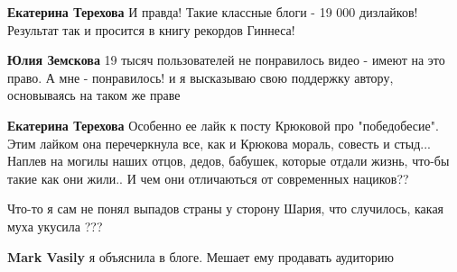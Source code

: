 \begin{itemize}
\begin{itemize}
\textbf{Екатерина Терехова} И правда! Такие классные блоги - 19 000 дизлайков! Результат так и просится в книгу рекордов Гиннеса!

 
\textbf{Юлия Земскова} 19 тысяч пользователей не понравилось видео - имеют на это право. А мне - понравилось! и я высказываю свою поддержку автору, основываясь на таком же праве

 
\textbf{Екатерина Терехова} Особенно ее лайк к посту Крюковой про "победобесие". Этим лайком она перечеркнула все, как и Крюкова мораль, совесть и стыд... Наплев на могилы наших отцов, дедов, бабушек, которые отдали жизнь, что-бы такие как они жили.. И чем они отличаються от современных нациков??
\end{itemize}

 
Что-то я сам не понял выпадов страны у сторону Шария, что случилось, какая муха
укусила ???

\begin{itemize}
 
\textbf{Mark Vasily} я объяснила в блоге. Мешает ему продавать аудиторию

 

\end{itemize}
\end{itemize}
